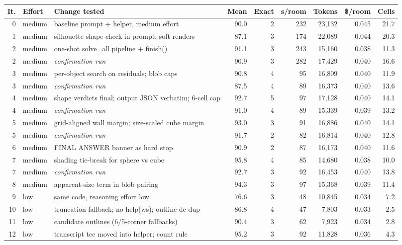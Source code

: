 \begin{tabular}{@{}rlp{5.6cm}rrrrrr@{}}
\toprule
It. & Effort & Change tested & Mean & Exact & s/room & Tokens & \$/room & Cells \\
\midrule
0 & medium & baseline prompt + helper, medium effort & 90.0 & 2 & 232 & 23,132 & 0.045 & 21.7 \\
1 & medium & silhouette shape check in prompt; soft renders & 87.1 & 3 & 174 & 22,089 & 0.044 & 20.3 \\
2 & medium & one-shot solve\_all pipeline + finish() & 91.1 & 3 & 243 & 15,160 & 0.038 & 11.3 \\
2 & medium & \emph{confirmation run} & 90.9 & 3 & 282 & 17,429 & 0.040 & 16.6 \\
3 & medium & per-object search on residuals; blob caps & 90.8 & 4 & 95 & 16,809 & 0.040 & 11.9 \\
3 & medium & \emph{confirmation run} & 87.5 & 4 & 89 & 16,373 & 0.040 & 13.6 \\
4 & medium & shape verdicts final; output JSON verbatim; 6-cell cap & 92.7 & 5 & 97 & 17,128 & 0.040 & 14.1 \\
4 & medium & \emph{confirmation run} & 91.0 & 4 & 89 & 15,339 & 0.039 & 13.2 \\
5 & medium & grid-aligned wall margin; size-scaled cube margin & 93.0 & 3 & 91 & 16,886 & 0.040 & 14.1 \\
5 & medium & \emph{confirmation run} & 91.7 & 2 & 82 & 16,814 & 0.040 & 12.8 \\
6 & medium & FINAL ANSWER banner as hard stop & 90.9 & 2 & 87 & 16,173 & 0.040 & 11.6 \\
7 & medium & shading tie-break for sphere vs cube & 95.8 & 4 & 85 & 14,680 & 0.038 & 10.0 \\
7 & medium & \emph{confirmation run} & 92.7 & 3 & 92 & 16,453 & 0.040 & 13.8 \\
8 & medium & apparent-size term in blob pairing & 94.3 & 3 & 97 & 15,368 & 0.039 & 11.4 \\
9 & low & same code, reasoning effort low & 76.6 & 3 & 48 & 10,845 & 0.034 & 7.2 \\
10 & low & truncation fallback; no help(ws); outline de-dup & 86.8 & 4 & 47 & 7,803 & 0.033 & 2.5 \\
11 & low & candidate outlines (6/5-corner fallbacks) & 90.4 & 3 & 62 & 7,923 & 0.034 & 2.8 \\
12 & low & transcript tee moved into helper; count rule & 95.2 & 3 & 92 & 11,828 & 0.036 & 4.3 \\

\end{tabular}
